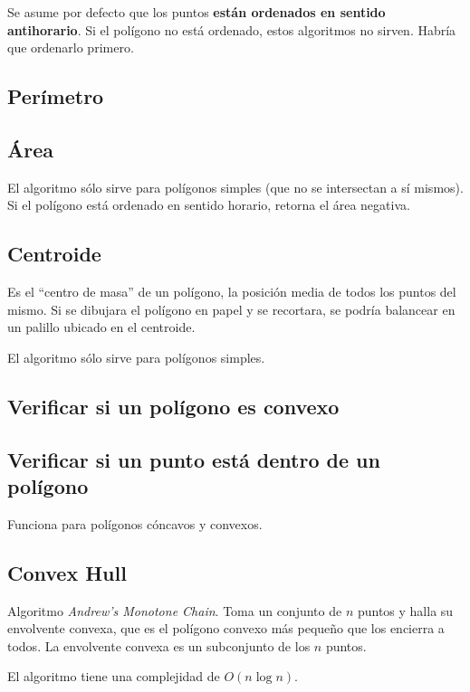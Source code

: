 \documentclass{article}
\begin{document}
\begin{multicols}{2}
Se asume por defecto que los puntos {\bf están ordenados en sentido antihorario}. Si el polígono no está ordenado, estos algoritmos no sirven. Habría que ordenarlo primero.

\subsection{Perímetro}


\subsection{Área}
El algoritmo sólo sirve para polígonos simples (que no se intersectan a sí mismos). Si el polígono está ordenado en sentido horario, retorna el área negativa.


\subsection{Centroide}
Es el ``centro de masa'' de un polígono, la posición media de todos los puntos del mismo. Si se dibujara el polígono en papel y se recortara, se podría balancear en un palillo ubicado en el centroide. 

El algoritmo sólo sirve para polígonos simples.



\subsection{Verificar si un polígono es convexo}


\subsection{Verificar si un punto está dentro de un polígono}
Funciona para polígonos cóncavos y convexos.


\subsection{Convex Hull}
Algoritmo \emph{Andrew's Monotone Chain}. Toma un conjunto de \( n \) puntos y halla su envolvente convexa, que es el polígono convexo más pequeño que los encierra a todos. La envolvente convexa es un subconjunto de los \( n \) puntos.

El algoritmo tiene una complejidad de \( O( n \log n ) \).



\end{multicols}	
\end{document}
